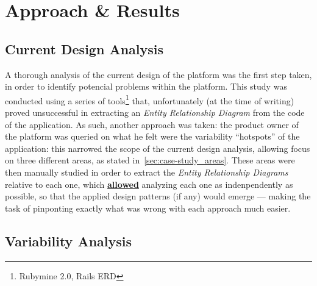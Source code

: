 \chapter{Approach \& Results}\label{chap:approach_results}



\section{Current Design Analysis}\label{sec:current_design_analysis}

A thorough analysis of the current design of the platform was the first step taken, in order to identify potencial problems within the platform. This study was conducted using a series of tools\footnote{Rubymine 2.0\cite{rubymine}, Rails ERD\cite{rails_erd}} that, unfortunately (at the time of writing) proved unsuccessful in extracting an \emph{Entity Relationship Diagram} from the code of the application. As such, another approach was taken: the product owner of the platform was queried on what he felt were the variability ``hotspots'' of the application: this narrowed the scope of the current design analysis, allowing focus on three different areas, as stated in~\ref{sec:case-study_areas}. These areas were then manually studied in order to extract the \emph{Entity Relationship Diagrams} relative to each one, which \textbf{\underline{allowed}} analyzing each one as indenpendently as possible, so that the applied design patterns (if any) would emerge --- making the task of pinponting exactly what was wrong with each approach much easier.

\section{Variability Analysis}\label{sec:variability_analysis}

